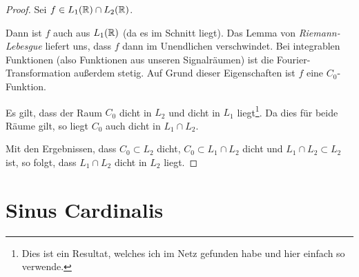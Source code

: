 \begin{proof}
Sei $f\in L_1(\mathbb{R}) \cap L_2(\mathbb{R})$.

Dann ist $f$ auch aus $L_1(\mathbb{R})$ (da es im Schnitt liegt). Das Lemma von
\emph{Riemann-Lebesgue} liefert uns, dass $f$ dann im Unendlichen verschwindet. Bei
integrablen Funktionen (also Funktionen aus unseren Signalräumen) ist die Fourier-Transformation
außerdem stetig. Auf Grund dieser Eigenschaften ist $f$ eine $C_0$-Funktion.

Es gilt, dass der Raum $C_0$ dicht in $L_2$ und dicht in $L_1$ liegt\footnote{Dies ist ein Resultat, welches
ich im Netz gefunden habe und hier einfach so verwende.}. Da dies für beide Räume gilt, so liegt
$C_0$ auch dicht in $L_1 \cap L_2$.

Mit den Ergebnissen, dass $C_0 \subset L_2$ dicht, $C_0 \subset L_1 \cap L_2$ dicht und 
$L_1 \cap L_2 \subset L_2$ ist, so folgt, dass $L_1 \cap L_2$ dicht in $L_2$ liegt.
\end{proof}

\section{Sinus Cardinalis}\label{sec:sincproofs}

